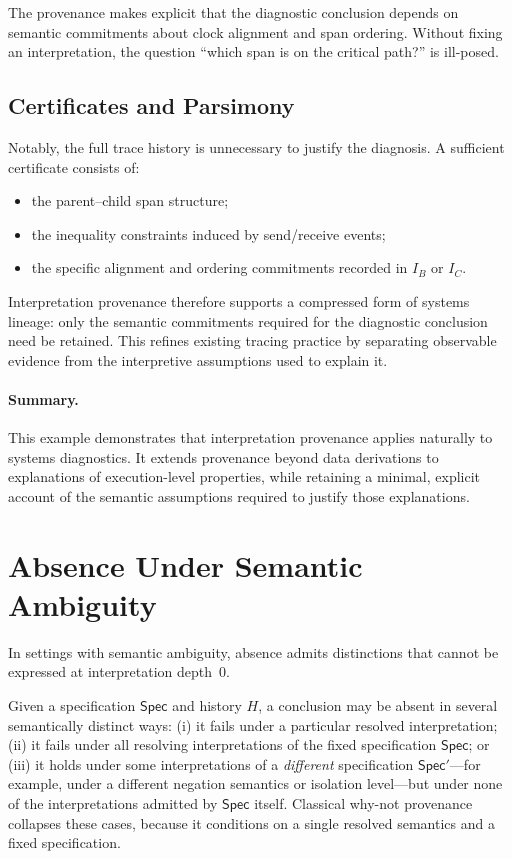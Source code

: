 \documentclass[acmsmall,nonacm]{acmart}
\theoremstyle{remark}
\numberwithin{definition}{section}
\numberwithin{theorem}{section}
\numberwithin{lemma}{section}
\numberwithin{corollary}{section}
\numberwithin{remark}{section}
\numberwithin{example}{section}
\numberwithin{observation}{section}
\numberwithin{assumption}{section}
\newcommand{\Spec}{\mathsf{Spec}}
\begin{document}
The provenance makes explicit that the diagnostic conclusion depends on semantic
commitments about clock alignment and span ordering.
Without fixing an interpretation, the question ``which span is on the critical
path?'' is ill-posed.

\subsection{Certificates and Parsimony}

Notably, the full trace history is unnecessary to justify the diagnosis.
A sufficient certificate consists of:
\begin{itemize}
  \item the parent--child span structure;
  \item the inequality constraints induced by send/receive events;
  \item the specific alignment and ordering commitments recorded in $I_B$ or
        $I_C$.
\end{itemize}

Interpretation provenance therefore supports a compressed form of systems lineage:
only the semantic commitments required for the diagnostic conclusion need be
retained.
This refines existing tracing practice by separating observable evidence from the
interpretive assumptions used to explain it.

\paragraph{Summary.}
This example demonstrates that interpretation provenance applies naturally to
systems diagnostics.
It extends provenance beyond data derivations to explanations of execution-level
properties, while retaining a minimal, explicit account of the semantic
assumptions required to justify those explanations.

\section{Absence Under Semantic Ambiguity}
\label{app:whynot}
In settings with semantic ambiguity, absence admits distinctions that cannot be
expressed at interpretation depth~0.

Given a specification $\Spec$ and history $H$, a conclusion may be absent in
several semantically distinct ways:
(i) it fails under a particular resolved interpretation;
(ii) it fails under all resolving interpretations of the fixed specification
$\Spec$; or
(iii) it holds under some interpretations of a \emph{different} specification
$\Spec'$—for example, under a different negation semantics or isolation level—but
under none of the interpretations admitted by $\Spec$ itself.
Classical why-not provenance collapses these cases, because it conditions on a
single resolved semantics and a fixed specification.
\end{document}
